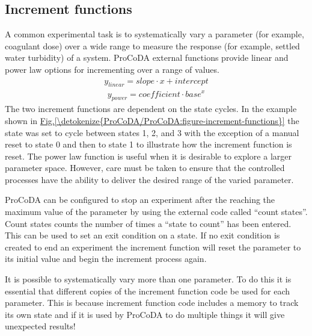 \documentclass[letterpaper,10pt,english]{sphinxmanual}
\begin{document}
\subsection{Increment functions}
\label{\detokenize{ProCoDA/ProCoDA:increment-functions}}
A common experimental task is to systematically vary a parameter (for example, coagulant dose) over a wide range to measure the response (for example, settled water turbidity) of a system. ProCoDA external functions provide linear and power law options for incrementing over a range of values.
\begin{equation}\label{equation:ProCoDA/ProCoDA:ProCoDA/ProCoDA:3}
\begin{split}y_{linear} = slope \cdot x + intercept\end{split}
\end{equation}\begin{equation}\label{equation:ProCoDA/ProCoDA:ProCoDA/ProCoDA:4}
\begin{split}y_{power} = coefficient \cdot base^x\end{split}
\end{equation}
The two increment functions are dependent on the state cycles. In the example shown in \hyperref[\detokenize{ProCoDA/ProCoDA:figure-increment-functions}]{Fig.\@ \ref{\detokenize{ProCoDA/ProCoDA:figure-increment-functions}}} the state was set to cycle between states 1, 2, and 3 with the exception of a manual reset to state 0 and then to state 1 to illustrate how the increment function is reset. The power law function is useful when it is desirable to explore a larger parameter space. However, care must be taken to ensure that the controlled processes have the ability to deliver the desired range of the varied parameter.

ProCoDA can be configured to stop an experiment after the reaching the maximum value of the parameter by using the external code called “count states”. Count states counts the number of times a “state to count” has been entered. This can be used to set an exit condition on a state. If no exit condition is created to end an experiment the increment function will reset the parameter to its initial value and begin the increment process again.

It is possible to systematically vary more than one parameter. To do this it is essential that different copies of the increment function code be used for each parameter. This is because increment function code includes a memory to track its own state and if it is used by ProCoDA to do multiple things it will give unexpected results!
\end{document}
